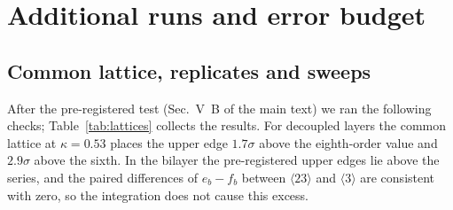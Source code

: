 \documentclass[aps,prb,twocolumn,superscriptaddress,floatfix]{revtex4-2}
\begin{document}
\section{Additional runs and error budget}

\subsection{Common lattice, replicates and sweeps}
\label{sec:s3runs}

After the pre-registered test (Sec.~V~B of the main text) we ran the following checks; Table~\ref{tab:lattices}
collects the results. For decoupled layers the common lattice at $\kappa=0.53$ places the upper edge $1.7\sigma$ above
the eighth-order value and $2.9\sigma$ above the sixth. In the bilayer the pre-registered upper edges lie above the
series, and the paired differences of $e_b-f_b$ between $\langle23\rangle$ and $\langle3\rangle$ are consistent with
zero, so the integration does not cause this excess.
\end{document}
